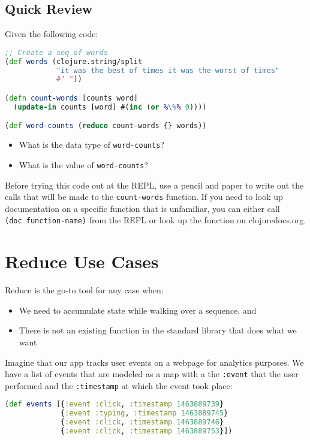 \documentclass[10pt,twoside,openright]{memoir}
\begin{document}
\subsection{Quick Review}

Given the following code:

\begin{lstlisting}[language=Clojure]
;; Create a seq of words
(def words (clojure.string/split
            "it was the best of times it was the worst of times"
            #" "))

(defn count-words [counts word]
  (update-in counts [word] #(inc (or %\%% 0))))

(def word-counts (reduce count-words {} words))
\end{lstlisting}

\begin{itemize}
\tightlist
\item
  What is the data type of \texttt{word-counts}?
\item
  What is the value of \texttt{word-counts}?
\end{itemize}

Before trying this code out at the REPL, use a pencil and paper to write
out the calls that will be made to the \texttt{count-words} function. If
you need to look up documentation on a specific function that is
unfamiliar, you can either call \texttt{(doc\ function-name)} from the
REPL or look up the function on clojuredocs.org.


\section{Reduce Use Cases}

Reduce is the go-to tool for any case when:

\begin{itemize}
\tightlist
\item
  We need to accumulate state while walking over a sequence, and
\item
  There is not an existing function in the standard library that does
  what we want
\end{itemize}

Imagine that our app tracks user events on a webpage for analytics
purposes. We have a list of events that are modeled as a map with a the
\texttt{:event} that the user performed and the \texttt{:timestamp} at
which the event took place:

\begin{lstlisting}[language=Clojure]
(def events [{:event :click, :timestamp 1463889739}
             {:event :typing, :timestamp 1463889745}
             {:event :click, :timestamp 1463889746}
             {:event :click, :timestamp 1463889753}])
\end{lstlisting}
\end{document}

